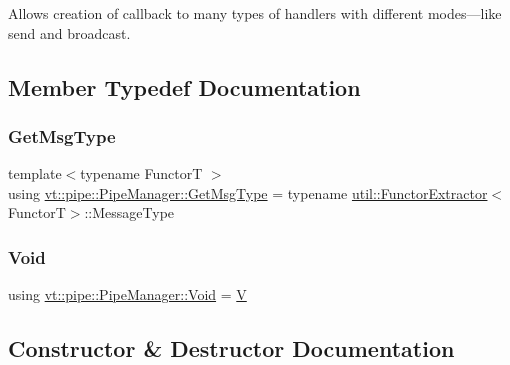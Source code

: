 Allows creation of callback to many types of handlers with different modes---like send and broadcast. 

\subsection{Member Typedef Documentation}
\mbox{\label{structvt_1_1pipe_1_1_pipe_manager_a221ce8bc0fc6639f43dad1e53a08c0d2}} 
\subsubsection{\texorpdfstring{Get\+Msg\+Type}{GetMsgType}}
{\footnotesize\ttfamily template$<$typename FunctorT $>$ \\
using \hyperlink{structvt_1_1pipe_1_1_pipe_manager_a221ce8bc0fc6639f43dad1e53a08c0d2}{vt\+::pipe\+::\+Pipe\+Manager\+::\+Get\+Msg\+Type} =  typename \hyperlink{structvt_1_1util_1_1_functor_extractor}{util\+::\+Functor\+Extractor}$<$FunctorT$>$\+::Message\+Type}

\mbox{\label{structvt_1_1pipe_1_1_pipe_manager_ab720c2580ecfd3ab36e49aeaaff64cc6}} 
\subsubsection{\texorpdfstring{Void}{Void}}
{\footnotesize\ttfamily using \hyperlink{structvt_1_1pipe_1_1_pipe_manager_ab720c2580ecfd3ab36e49aeaaff64cc6}{vt\+::pipe\+::\+Pipe\+Manager\+::\+Void} =  \hyperlink{structvt_1_1pipe_1_1_pipe_manager_t_l_a8d394521df58abfd90c1d81c998f22e3}{V}}



\subsection{Constructor \& Destructor Documentation}
\mbox{\label{structvt_1_1pipe_1_1_pipe_manager_aa2cf0e54dc146056c077aba1aa2ae42b}} 
